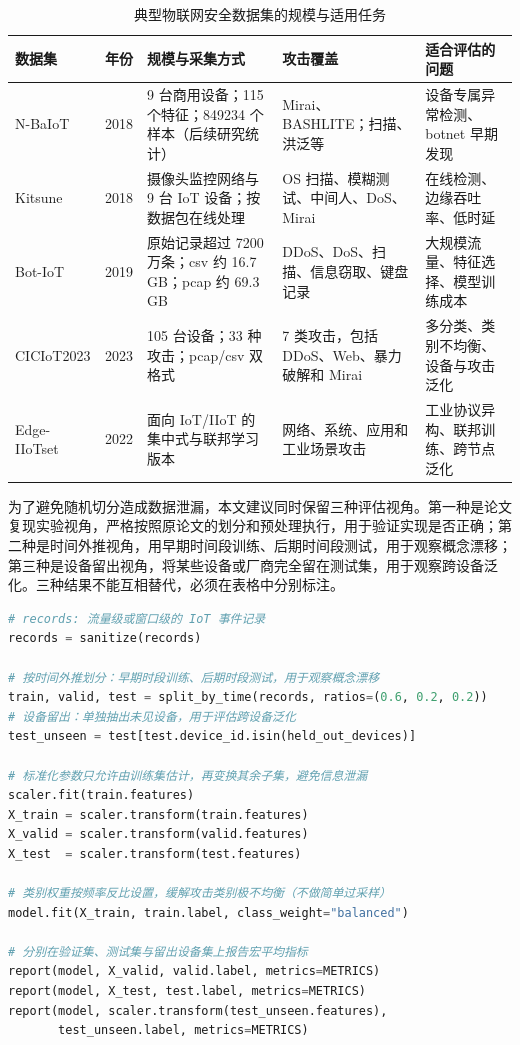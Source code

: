 \documentclass[twoside,withoutpreface,bwprint]{cumcmthesis}
\begin{document}
\begin{table}[H]
\centering
\caption{典型物联网安全数据集的规模与适用任务}
\label{tab:dataset-comparison}
\footnotesize
\begin{tabularx}{\textwidth}{p{2.4cm} p{1.0cm} p{2.7cm} X X}
\toprule
数据集 & 年份 & 规模与采集方式 & 攻击覆盖 & 适合评估的问题 \\
\midrule
N-BaIoT & 2018 & 9 台商用设备；115 个特征；849234 个样本（后续研究统计） & Mirai、BASHLITE；扫描、洪泛等 & 设备专属异常检测、botnet 早期发现 \\
Kitsune & 2018 & 摄像头监控网络与 9 台 IoT 设备；按数据包在线处理 & OS 扫描、模糊测试、中间人、DoS、Mirai & 在线检测、边缘吞吐率、低时延 \\
Bot-IoT & 2019 & 原始记录超过 7200 万条；csv 约 16.7 GB；pcap 约 69.3 GB & DDoS、DoS、扫描、信息窃取、键盘记录 & 大规模流量、特征选择、模型训练成本 \\
CICIoT2023 & 2023 & 105 台设备；33 种攻击；pcap/csv 双格式 & 7 类攻击，包括 DDoS、Web、暴力破解和 Mirai & 多分类、类别不均衡、设备与攻击泛化 \\
Edge-IIoTset & 2022 & 面向 IoT/IIoT 的集中式与联邦学习版本 & 网络、系统、应用和工业场景攻击 & 工业协议异构、联邦训练、跨节点泛化 \\
\bottomrule
\end{tabularx}
\end{table}

为了避免随机切分造成数据泄漏，本文建议同时保留三种评估视角。第一种是论文复现实验视角，严格按照原论文的划分和预处理执行，用于验证实现是否正确；第二种是时间外推视角，用早期时间段训练、后期时间段测试，用于观察概念漂移；第三种是设备留出视角，将某些设备或厂商完全留在测试集，用于观察跨设备泛化。三种结果不能互相替代，必须在表格中分别标注。

\vspace{2mm}
\begin{lstlisting}[language=Python,caption={按时间和设备留出的统一评估流程}]
# records: 流量级或窗口级的 IoT 事件记录
records = sanitize(records)

# 按时间外推划分：早期时段训练、后期时段测试，用于观察概念漂移
train, valid, test = split_by_time(records, ratios=(0.6, 0.2, 0.2))
# 设备留出：单独抽出未见设备，用于评估跨设备泛化
test_unseen = test[test.device_id.isin(held_out_devices)]

# 标准化参数只允许由训练集估计，再变换其余子集，避免信息泄漏
scaler.fit(train.features)
X_train = scaler.transform(train.features)
X_valid = scaler.transform(valid.features)
X_test  = scaler.transform(test.features)

# 类别权重按频率反比设置，缓解攻击类别极不均衡（不做简单过采样）
model.fit(X_train, train.label, class_weight="balanced")

# 分别在验证集、测试集与留出设备集上报告宏平均指标
report(model, X_valid, valid.label, metrics=METRICS)
report(model, X_test, test.label, metrics=METRICS)
report(model, scaler.transform(test_unseen.features),
       test_unseen.label, metrics=METRICS)
\end{lstlisting}
\end{document}
